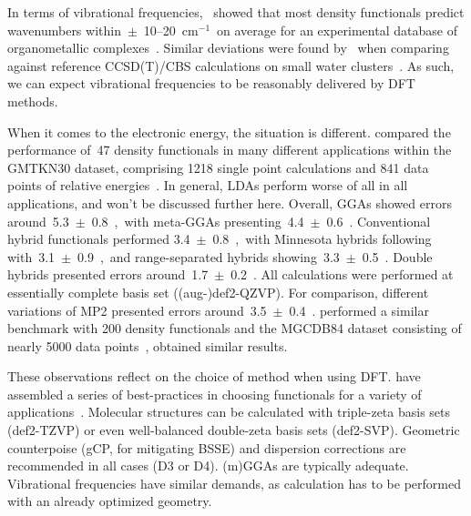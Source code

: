 
In terms of vibrational frequencies,~\citeauthor{Katari_2017} showed that most density functionals
predict wavenumbers within~$\pm$~10--20~cm$^{-1}$~on average for
an experimental database of organometallic complexes~\cite{Katari_2017}.
Similar deviations were found by~\citeauthor{Howard_2015}
when comparing against reference CCSD(T)/CBS calculations on
small water clusters~\cite{Howard_2015}.
As such,
we can expect vibrational frequencies to be reasonably delivered
by DFT methods.

When it comes to the electronic energy,
the situation is different.
\citeauthor{Goerigk_2011} compared the performance of~47 density functionals
in many different applications
within the GMTKN30 dataset,
comprising 1218 single point calculations
and 841 data points of relative energies~\cite{Goerigk_2011}.
In general,
LDAs perform worse of all in all applications,
and won't be discussed further here.
Overall,
GGAs showed errors around~5.3~$\pm$~0.8~\kcalmol,~with meta-GGAs presenting~4.4~$\pm$~0.6~\kcalmol.
Conventional hybrid functionals performed 3.4~$\pm$~0.8~\kcalmol,~with Minnesota hybrids following with~3.1~$\pm$~0.9~\kcalmol,~and range-separated hybrids showing~3.3~$\pm$~0.5~\kcalmol.
Double hybrids presented errors
around~1.7~$\pm$~0.2~\kcalmol.
All calculations were performed at essentially complete basis set
((aug-)def2-QZVP).
For comparison,
different variations of MP2
presented errors around~3.5~$\pm$~0.4~\kcalmol.
\citeauthor{Mardirossian_2017} performed a similar
benchmark with 200 density functionals and the MGCDB84 dataset
consisting of nearly 5000 data points~\cite{Mardirossian_2017},
obtained similar results.

These observations reflect on the choice of method when using DFT.\@
\citeauthor{Bursch_2022} have assembled a series of best-practices in choosing functionals for a variety of applications~\cite{Bursch_2022}.
Molecular structures can be calculated with triple-zeta basis sets (def2-TZVP)
or even well-balanced double-zeta basis sets (def2-SVP).
Geometric counterpoise (gCP,
for mitigating BSSE) and dispersion corrections are recommended in all cases (D3 or D4).
(m)GGAs are typically adequate.
Vibrational frequencies have similar demands,
as calculation has to be performed with an already optimized geometry.

